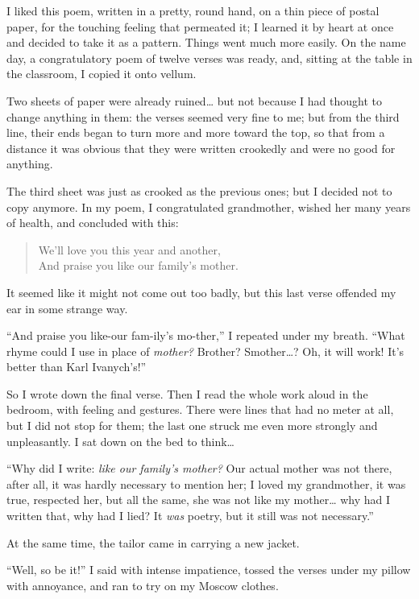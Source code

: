 I liked this poem, written in a pretty, round hand, on a thin piece of postal paper, for the touching feeling that permeated it; I learned it by heart at once and decided to take it as a pattern. Things went much more easily. On the name day, a congratulatory poem of twelve verses was ready, and, sitting at the table in the classroom, I copied it onto vellum.

Two sheets of paper were already ruined\ldots{} but not because I had thought to change anything in them: the verses seemed very fine to me; but from the third line, their ends began to turn more and more toward the top, so that from a distance it was obvious that they were written crookedly and were no good for anything.

The third sheet was just as crooked as the previous ones; but I decided not to copy anymore. In my poem, I congratulated grandmother, wished her many years of health, and concluded with this:

\begin{verse}
We'll love you this year and another,\\
And praise you like our family's mother.
\end{verse}

It seemed like it might not come out too badly, but this last verse offended my ear in some strange way.

``And praise you like-our fam-ily's mo-ther,'' I repeated under my breath. ``What rhyme could I use in place of \emph{mother?} Brother? Smother\ldots{}? Oh, it will work! It's better than Karl Ivanych's!'' %

So I wrote down the final verse. Then I read the whole work aloud in the bedroom, with feeling and gestures. There were lines that had no meter at all, but I did not stop for them; the last one struck me even more strongly and unpleasantly. I sat down on the bed to think\ldots{}

``Why did I write: \textit{like our family's mother?} Our actual mother was not there, after all, it was hardly necessary to mention her; I loved my grandmother, it was true, respected her, but all the same, she was not like my mother\ldots{} why had I written that, why had I lied? It \emph{was} poetry, but it still was not necessary.'' %

At the same time, the tailor came in carrying a new jacket.

``Well, so be it!'' I said with intense impatience, tossed the verses under my pillow with annoyance, and ran to try on my Moscow clothes. %

